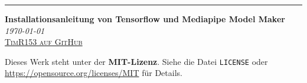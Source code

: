 \documentclass[12pt,a4paper]{article}
\begin{document}
\begin{titlepage} 
	
	\raggedleft 
	
	\rule{1pt}{\textheight}
	\hspace{0.05\textwidth}
  \parbox[b]{0.75\textwidth}{
    {\raggedright
      {\Huge\bfseries \nohyphens{Installationsanleitung von Tensorflow und Mediapipe Model Maker}}\\[2\baselineskip]
      {\large\textit{\today}}\\[4\baselineskip]
      {\Large\textsc{\href{https://github.com/TimR153}{TimR153 auf GitHub}}}
      
      \vspace{0.5\textheight}
      
      {\noindent Dieses Werk steht unter der \textbf{MIT-Lizenz}.  
      Siehe die Datei \texttt{LICENSE} oder \url{https://opensource.org/licenses/MIT} für Details.}\\[\baselineskip]
    }
  }

\end{titlepage}
\thispagestyle{empty}
\tableofcontents
\thispagestyle{empty}
\newpage

\end{document}
